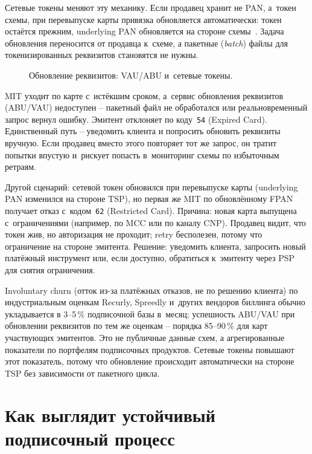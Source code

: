Сетевые токены меняют эту механику. Если продавец хранит не PAN,
а~токен схемы, при перевыпуске карты привязка обновляется
автоматически: токен остаётся прежним, underlying PAN обновляется
на стороне схемы~\cite{visa-lifecycle-management}. Задача обновления
переносится от продавца к~схеме, а пакетные (\textit{batch}) файлы для токенизированных
реквизитов становятся не нужны.

\begin{figure}[tbp]
  \centering
  \caption{Обновление реквизитов: VAU/ABU и~сетевые токены.}\label{fig:credential-update-flow}
\end{figure}

MIT уходит по карте с~истёкшим сроком, а~сервис
обновления реквизитов (ABU/VAU) недоступен -- пакетный файл
не обработался или реальновременный запрос вернул ошибку.
Эмитент отклоняет по коду~\texttt{54} (Expired Card).
Единственный путь -- уведомить клиента и попросить обновить
реквизиты вручную. Если продавец вместо этого повторяет тот же
запрос, он тратит попытки впустую и~рискует попасть
в~мониторинг схемы по избыточным ретраям.

Другой сценарий: сетевой токен обновился при перевыпуске карты
(underlying PAN изменился на стороне TSP), но первая же MIT
по обновлённому FPAN получает отказ с~кодом~\texttt{62}
(Restricted Card). Причина: новая карта выпущена
с~ограничениями (например, по MCC или по каналу CNP).
Продавец видит, что токен жив, но авторизация не проходит;
retry бесполезен, потому что ограничение на стороне эмитента.
Решение: уведомить клиента, запросить новый платёжный
инструмент или, если доступно, обратиться к~эмитенту через
PSP для снятия ограничения.

Involuntary churn (отток из-за платёжных отказов, не по решению
клиента) по индустриальным оценкам Recurly, Spreedly и~других
вендоров биллинга обычно укладывается в 3--5\,\% подписочной
базы в~месяц; успешность ABU/VAU при обновлении реквизитов
по тем же оценкам -- порядка 85--90\,\% для карт участвующих
эмитентов. Это не публичные данные схем, а агрегированные
показатели по портфелям подписочных продуктов. Сетевые токены
повышают этот показатель, потому что обновление происходит
автоматически на стороне TSP без зависимости от пакетного цикла.

\section{Как выглядит устойчивый подписочный процесс}\label{sec:subscriptions-anti-churn}

